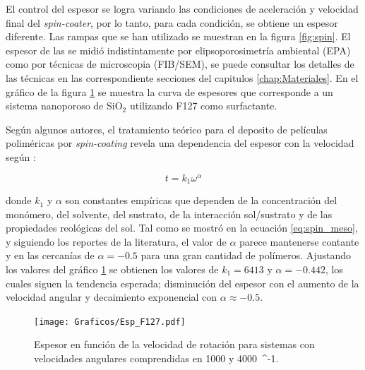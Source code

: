 		El control del espesor se logra variando las condiciones de aceleración y velocidad final del \textit{spin-coater}, por lo tanto, para cada condición, se obtiene un espesor diferente. Las rampas que se han utilizado se muestran en la figura \ref{fig:spin}. El espesor de las \pdm\space se midió indistintamente por elipsoporosimetría ambiental (EPA) como por técnicas de microscopia (FIB/SEM), se puede consultar los detalles de las técnicas en las correspondiente secciones del capitulos \ref{chap:Materiales}. En el gráfico de la figura \ref{fig:esp} se muestra la curva de espesores que corresponde a un sistema nanoporoso de SiO$_2$ utilizando F127 como surfactante. 

		\pagebreak

		Según algunos autores, el tratamiento teórico para el deposito de películas poliméricas por \textit{spin-coating} revela una dependencia del espesor con la velocidad según \cite{Norrman2005,Meyerhofer1978,Bornside1989,Lora1990}:
					
						\begin{equation}
			 			    t = k_1 \omega^{\alpha}
			 		    	 \label{eq:spin_meso}
							\end{equation}
		
		donde $k_1$ y $\alpha$ son constantes empíricas que dependen de la concentración del monómero, del solvente, del sustrato, de la interacción sol/sustrato y  de las propiedades reológicas del sol. Tal como se mostró en la ecuación \ref{eq:spin_meso}, y siguiendo los reportes de la literatura, el valor de $\alpha$ parece mantenerse contante y en las cercanías de $\alpha=-0.5$ para una gran cantidad de polímeros. Ajustando los valores del gráfico \ref{fig:esp} se obtienen los valores de $k_1=6413$ y  $\alpha=-0.442$, los cuales siguen la tendencia esperada; disminución del espesor con el aumento de la velocidad angular y decaimiento exponencial con $\alpha \approx -0.5$. 
			\begin{figure}[!ht]
						\begin{center}
						\texttt{[image: Graficos/Esp\_F127.pdf]}
						\caption[Espesor en función de la velocidad de rotación.]{Espesor en función de la velocidad de rotación para sistemas \pdmF con velocidades angulares comprendidas en 1000 y \SI{4000}{\minute^{-1}.}}
						\label{fig:esp}
						\end{center}
						\end{figure}

